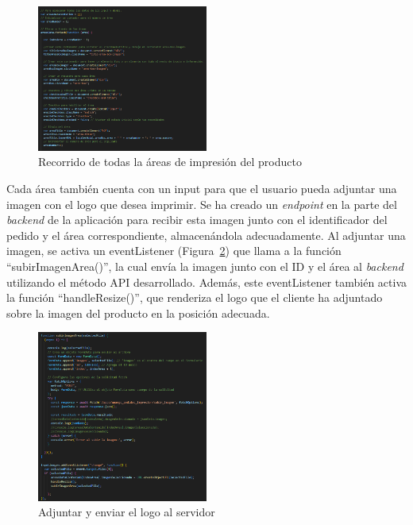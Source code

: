 \documentclass[12pt]{article}
\begin{document}
\begin{figure}[ht]
    \centering
    \includegraphics[width=0.5\textwidth]{imagenesUS3-modal/recorrerAreasyMostrar.png}
    \caption{\label{fig:recorrerAreas} Recorrido de todas la áreas de impresión del producto}
    \vspace{\fill}
\end{figure}

Cada área también cuenta con un input para que el usuario pueda adjuntar una imagen con el logo que desea imprimir. Se ha creado un \textit{endpoint} en 
la parte del \textit{backend} de la aplicación para recibir esta imagen junto con el identificador del pedido y el área correspondiente, 
almacenándola adecuadamente. Al adjuntar una imagen, se activa un eventListener (Figura~\ref{fig:adjuntarLogo}) que llama a la función ``subirImagenArea()'', 
la cual envía la imagen junto con el ID y el área al \textit{backend} utilizando el método API desarrollado. Además, este eventListener 
también activa la función ``handleResize()'', que renderiza el logo que el cliente ha adjuntado sobre la imagen del producto en la posición adecuada.

\begin{figure}[ht]
    \centering
    \includegraphics[width=0.5\textwidth]{imagenesUS3-modal/AdjuntarLogoFetch.png}
    \caption{\label{fig:adjuntarLogo} Adjuntar y enviar el logo al servidor}
    \vspace{\fill}
\end{figure}
\end{document}
